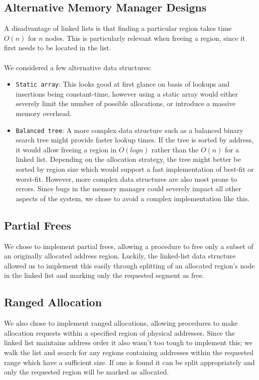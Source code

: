 \subsection{Alternative Memory Manager Designs}\label{m1-6}
A disadvantage of linked lists is that finding a particular region takes time $O(n)$ for $n$ nodes. This is particularly relevant when freeing a region, since it first needs to be located in the list.
\\\\
We considered a few alternative data structures:
\begin{itemize}[itemsep=0pt]
        \item \texttt{Static array}: This looks good at first glance on basis of lookups and insertions being constant-time, however using a static array would either severely limit the number of possible allocations, or introduce a massive memory overhead.
        \item \texttt{Balanced tree}: A more complex data structure such as a balanced binary search tree might provide faster lookup times. If the tree is sorted by address, it would allow freeing a region in $O(logn)$ rather than the $O(n)$ for a linked list. Depending on the allocation strategy, the tree might better be sorted by region size which would support a fast implementation of best-fit or worst-fit. However, more complex data structures are also most prone to errors. Since bugs in the memory manager could severely impact all other aspects of the system, we chose to avoid a complex implementation like this. 
\end{itemize}

\subsection{Partial Frees}
We chose to implement partial frees, allowing a procedure to free only a subset of an originally allocated address region. Luckily, the linked-list data structure allowed us to implement this easily through splitting of an allocated region's node in the linked list and marking only the requested segment as free.

\subsection{Ranged Allocation}
We also chose to implement ranged allocations, allowing procedures to make allocation requests within a specified region of physical addresses. Since the linked list maintains address order it also wasn't too tough to implement this; we walk the list and search for any regions containing addresses within the requested range which have a sufficient size. If one is found it can be split appropriately and only the requested region will be marked as allocated.
